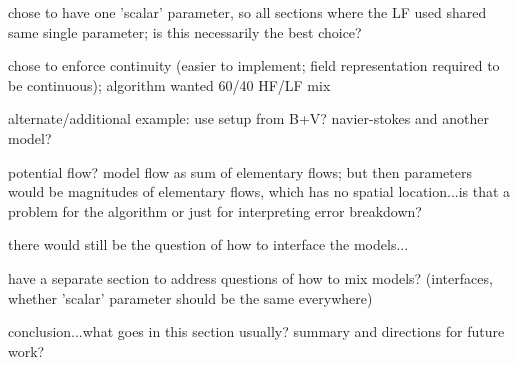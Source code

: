     \item chose to have one 'scalar' parameter, so all sections where the LF used shared same single parameter; is this necessarily the best choice?
    \item chose to enforce continuity (easier to implement; field representation required to be continuous); algorithm wanted 60/40 HF/LF mix
    \eit
  \item alternate/additional example: use setup from B+V? navier-stokes and another model? 
    \bit
    \item potential flow? model flow as sum of elementary flows; but then parameters would be magnitudes of elementary flows, which has no spatial location...is that a problem for the algorithm or just for interpreting error breakdown?
    \item there would still be the question of how to interface the models...
    \eit
  \item have a separate section to address questions of how to mix models? (interfaces, whether 'scalar' parameter should be the same everywhere)
  \eit
\item conclusion...what goes in this section usually? summary and directions for future work?
\eit

